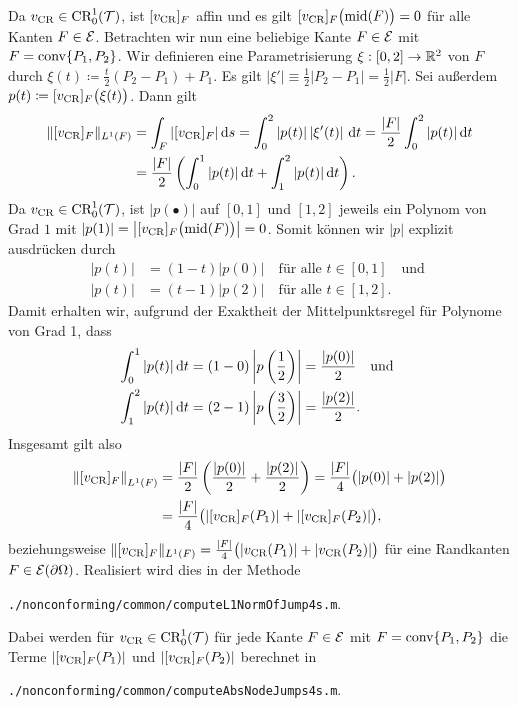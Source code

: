 Da $v_\textup{CR}\in\textup{CR}^1_0(\mathcal{T})$, ist $[v_\textup{CR}]_F$ affin und es gilt
$[v_\textup{CR}]_F\big(\textup{mid}(F)\big)=0$ für alle Kanten $F\in\mathcal{E}$.
Betrachten wir nun eine beliebige Kante $F\in\mathcal{E}$ mit $F=\textup{conv}\{P_1,P_2\}$. 
Wir definieren eine Parametrisierung $\xi:[0,2]\to\mathbb{R}^2$ von $F$ durch
$\xi(t)\coloneqq \frac{t}{2}(P_2-P_1)+P_1$. 
Es gilt $\left|\xi'\right|\equiv \frac{1}{2}|P_2-P_1|=\frac{1}{2}|F|$.
Sei außerdem
$p(t)\coloneqq [v_\textup{CR}]_F\big(\xi(t)\big)$. Dann gilt
\begin{align*}
  \Vert [v_\textup{CR}]_F\Vert_{L^1(F)} 
  &=
  \int_F |[v_\textup{CR}]_F|\,\mathrm{d}s 
  = \int_0^2 |p(t)|\left|\xi'(t)\right|\,\mathrm{d}t
  = \frac{|F|}{2}\int_0^2 |p(t)|\,\mathrm{d}t\\
  &= \frac{|F|}{2}\left(\int_0^1 |p(t)|\,\mathrm{d}t + \int_1^2 |p(t)|\,\mathrm{d}t\right).
\end{align*}
Da $v_\textup{CR}\in\textup{CR}^1_0(\mathcal{T})$, ist $|p(\bullet)|$ auf $[0,1]$ und $[1,2]$ jeweils
ein Polynom von Grad $1$ mit $|p(1)|=\left|[v_\textup{CR}]_F\big(\textup{mid}(F)\big)\right|=0$. 
Somit können wir $|p|$ explizit ausdrücken durch
\begin{align*}
  |p(t)|&=(1-t)|p(0)| \quad\text{für alle }t\in[0,1] \quad\text{und }\\
  |p(t)|&=(t-1)|p(2)| \quad\text{für alle }t\in[1,2].
\end{align*}
Damit erhalten wir, aufgrund der Exaktheit der Mittelpunktsregel für Polynome
von Grad 1, dass
\begin{align*}
  \int_0^1 |p(t)|\,\mathrm{d}t 
  &= 
  (1-0)\left|p\left( \frac{1}{2} \right)\right|
  =
  \frac{|p(0)|}{2}\quad\text{und }\\
  \int_1^2 |p(t)|\,\mathrm{d}t 
  &= 
  (2-1)\left|p\left( \frac{3}{2} \right)\right|
  =
  \frac{|p(2)|}{2}.
\end{align*}
Insgesamt gilt also
\begin{align*}
  \left\Vert [v_\textup{CR}]_F\right\Vert_{L^1(F)} 
  &=
  \frac{|F|}{2}\left(\frac{|p(0)|}{2} + \frac{|p(2)|}{2}\right)
  =
  \frac{|F|}{4}\big(|p(0)|+|p(2)|\big)\\
  &= 
  \frac{|F|}{4}\big(|[v_\textup{CR}]_F(P_1)|+|[v_\textup{CR}]_F(P_2)|\big),
\end{align*}
beziehungsweise 
  $\Vert [v_\textup{CR}]_F\Vert_{L^1(F)} =
  \frac{|F|}{4}\big(|v_\textup{CR}(P_1)|+|v_\textup{CR}(P_2)|\big)$ für eine Randkanten
  $F\in\mathcal{E}(\partial\Omega)$.
Realisiert wird dies in der Methode
\begin{center}
  \texttt{./nonconforming/common/computeL1NormOfJump4s.m}.
\end{center}
Dabei werden für $v_\textup{CR}\in\textup{CR}^1_0(\mathcal{T})$ für jede Kante $F\in\mathcal{E}$ mit
$F=\textup{conv}\{P_1,P_2\}$ die Terme $|[v_\textup{CR}]_F(P_1)|$ und $|[v_\textup{CR}]_F(P_2)|$
berechnet in
\begin{center}
  \texttt{./nonconforming/common/computeAbsNodeJumps4s.m}.
\end{center}

